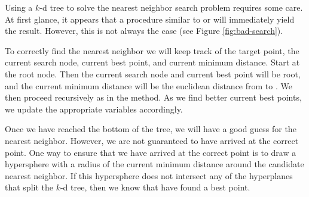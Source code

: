Using a $k$-d tree to solve the nearest neighbor search problem requires some care.
At first glance, it appears that a procedure similar to  or  will immediately yield the result.
However, this is not always the case (see Figure \ref{fig:bad-search}).

To correctly find the nearest neighbor we will keep track of the target point, the current search node, current best point, and current minimum distance.
Start at the root node.
Then the current search node and current best point will be root, and the current minimum distance will be the euclidean distance from  to .
We then proceed recursively as in the  method.
As we find better current best points, we update the appropriate variables accordingly.

Once we have reached the bottom of the tree, we will have a good guess for the nearest neighbor.
However, we are not guaranteed to have arrived at the correct point.
One way to ensure that we have arrived at the correct point is to draw a hypersphere with a radius of the current minimum distance around the candidate nearest neighbor.
If this hypersphere does not intersect any of the hyperplanes that split the $k$-d tree, then we know that have found a best point.

